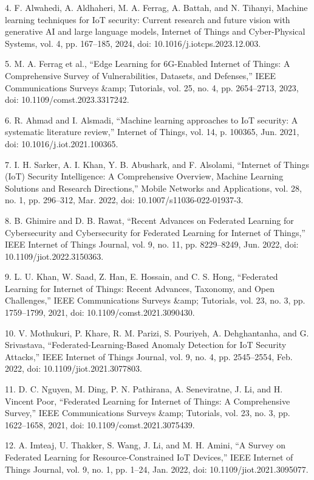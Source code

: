 4. F. Alwahedi, A. Aldhaheri, M. A. Ferrag, A. Battah, and N. Tihanyi,
Machine learning techniques for IoT security: Current research and
future vision with generative AI and large language models, Internet of
Things and Cyber-Physical Systems, vol. 4, pp. 167--185, 2024, doi:
10.1016/j.iotcps.2023.12.003.

5. M. A. Ferrag et al., ``Edge Learning for 6G-Enabled Internet of
Things: A Comprehensive Survey of Vulnerabilities, Datasets, and
Defenses,'' IEEE Communications Surveys \&amp; Tutorials, vol. 25, no.
4, pp. 2654--2713, 2023, doi: 10.1109/comst.2023.3317242.

6. R. Ahmad and I. Alsmadi, ``Machine learning approaches to IoT
security: A systematic literature review,'' Internet of Things, vol. 14,
p. 100365, Jun. 2021, doi: 10.1016/j.iot.2021.100365.

7. I. H. Sarker, A. I. Khan, Y. B. Abushark, and F. Alsolami, ``Internet
of Things (IoT) Security Intelligence: A Comprehensive Overview, Machine
Learning Solutions and Research Directions,'' Mobile Networks and
Applications, vol. 28, no. 1, pp. 296--312, Mar. 2022, doi:
10.1007/s11036-022-01937-3.

8. B. Ghimire and D. B. Rawat, ``Recent Advances on Federated Learning
for Cybersecurity and Cybersecurity for Federated Learning for Internet
of Things,'' IEEE Internet of Things Journal, vol. 9, no. 11, pp.
8229--8249, Jun. 2022, doi: 10.1109/jiot.2022.3150363.

9. L. U. Khan, W. Saad, Z. Han, E. Hossain, and C. S. Hong, ``Federated
Learning for Internet of Things: Recent Advances, Taxonomy, and Open
Challenges,'' IEEE Communications Surveys \&amp; Tutorials, vol. 23, no.
3, pp. 1759--1799, 2021, doi: 10.1109/comst.2021.3090430.

10. V. Mothukuri, P. Khare, R. M. Parizi, S. Pouriyeh, A. Dehghantanha,
and G. Srivastava, ``Federated-Learning-Based Anomaly Detection for IoT
Security Attacks,'' IEEE Internet of Things Journal, vol. 9, no. 4, pp.
2545--2554, Feb. 2022, doi: 10.1109/jiot.2021.3077803.

11. D. C. Nguyen, M. Ding, P. N. Pathirana, A. Seneviratne, J. Li, and
H. Vincent Poor, ``Federated Learning for Internet of Things: A
Comprehensive Survey,'' IEEE Communications Surveys \&amp; Tutorials,
vol. 23, no. 3, pp. 1622--1658, 2021, doi: 10.1109/comst.2021.3075439.

12. A. Imteaj, U. Thakker, S. Wang, J. Li, and M. H. Amini, ``A Survey
on Federated Learning for Resource-Constrained IoT Devices,'' IEEE
Internet of Things Journal, vol. 9, no. 1, pp. 1--24, Jan. 2022, doi:
10.1109/jiot.2021.3095077.

